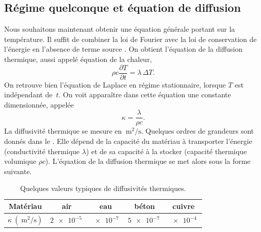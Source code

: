 \documentclass[12pt,fancy]{cours}
\begin{document}
\subsection{Régime quelconque et équation de diffusion}


Nous souhaitons maintenant obtenir une équation générale portant sur la température. Il suffit de combiner la loi de Fourier  avec la loi de conservation de l’énergie en l’absence de terme source . On obtient l'équation de la diffusion thermique, aussi appelé équation de la chaleur,
\begin{equation}
\rho c\frac{\partial T}{\partial t}=\lambda\,\Delta{T}.
\end{equation}
On retrouve bien l’équation de Laplace  en régime stationnaire, lorsque $T$ est indépendant de~$t$. On voit apparaître dans cette équation une constante dimensionnée, appelée 
\begin{equation}
\kappa = \dfrac{\lambda}{\rho c}.
\end{equation}
La diffusivité thermique se mesure en $\SI{}{\meter\squared\per\second}$. Quelques ordres de grandeurs sont donnés dans le . Elle dépend de la capacité du matériau à transporter l’énergie (conductivité thermique $\lambda$) et de sa capacité à la stocker (capacité thermique volumique $\rho c$). L’équation de la diffusion thermique se met alors sous la forme suivante.
\begin{table}[H]
  \centering
  \begin{tabular}{|c|c|c|c|c|}
  \hline
  Matériau & air & eau & béton & cuivre \\
  \hline
  $\kappa ~(\SI{}{\meter\squared\per\second})$ & $\SI{2e-5}{}$  & $\SI{e-7}{}$ & $\SI{5e-7}{}$ & $\SI{e-4}{}$ \\
  \hline
  \end{tabular}
  \caption{Quelques valeurs typiques de diffusivités thermiques.}
  \label{tab:lambda}
  \end{table}
\end{document}

